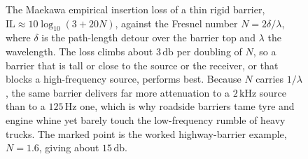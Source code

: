 \begin{figure}[htbp]
\centering
{}
\caption[Maekawa barrier insertion-loss curve]{The Maekawa empirical
insertion loss of a thin rigid barrier, $\text{IL}\approx
10\log_{10}(3+20N)$, against the Fresnel number $N=2\delta/\lambda$, where
$\delta$ is the path-length detour over the barrier top and $\lambda$ the
wavelength. The loss climbs about $3\,\si{\decibel}$ per doubling of $N$,
so a barrier that is tall or close to the source or the receiver, or that
blocks a high-frequency source, performs best. Because $N$ carries
$1/\lambda$, the same barrier delivers far more attenuation to a
$2\,\si{\kilo\hertz}$ source than to a $125\,\si{\hertz}$ one, which is
why roadside barriers tame tyre and engine whine yet barely touch the
low-frequency rumble of heavy trucks. The marked point is the worked
highway-barrier example, $N=1.6$, giving about $15\,\si{\decibel}$.}
\label{fig:vol03ch07:barrier-maekawa}
\end{figure}
